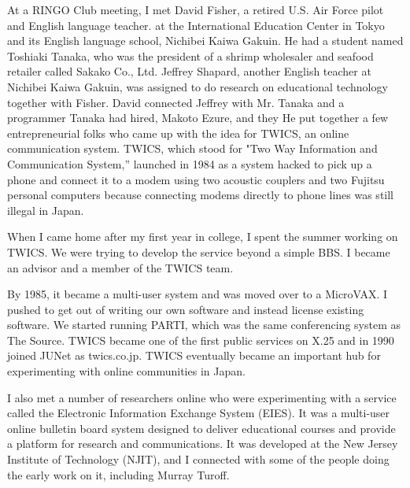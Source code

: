 At a RINGO Club meeting, I met David Fisher, a retired U.S. Air Force pilot and English language teacher. at the International Education Center in Tokyo and its English language school, Nichibei Kaiwa Gakuin. He had a student named Toshiaki Tanaka, who was the president of a shrimp wholesaler and seafood retailer called Sakako Co., Ltd. Jeffrey Shapard, another English teacher at Nichibei Kaiwa Gakuin, was assigned to do research on educational technology together with Fisher. David connected Jeffrey with Mr. Tanaka and a programmer Tanaka had hired, Makoto Ezure, and they He put together a few entrepreneurial folks who came up with the idea for TWICS, an online communication system. TWICS, which stood for "Two Way Information and Communication System,” launched in 1984 as a system hacked to pick up a phone and connect it to a modem using two acoustic couplers and two Fujitsu personal computers because connecting modems directly to phone lines was still illegal in Japan.
% 
% 


When I came home after my first year in college, I spent the summer working on TWICS. We were trying to develop the service beyond a simple BBS. I became an advisor and a member of the TWICS team. 

By 1985, it became a multi-user system and was moved over to a MicroVAX. I pushed to get out of writing our own software and instead license existing software. We started running PARTI, which was the same conferencing system as The Source. TWICS became one of the first public services on X.25 and in 1990 joined JUNet as twics.co.jp. TWICS eventually became an important hub for experimenting with online communities in Japan.
% 
% 

I also met a number of researchers online who were experimenting with a service called the Electronic Information Exchange System (EIES). It was a multi-user online bulletin board system designed to deliver educational courses and provide a platform for research and communications. It was developed at the New Jersey Institute of Technology (NJIT), and I connected with some of the people doing the early work on it, including Murray Turoff.

